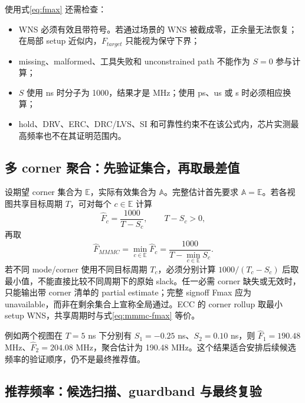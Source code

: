 \documentclass[UTF8,a4paper,11pt,fontset=fandol]{ctexart}
\numberwithin{equation}{section}
\begin{document}
使用式\eqref{eq:fmax} 还需检查：
\begin{itemize}
  \item WNS 必须有效且带符号。若通过场景的 WNS 被截成零，正余量无法恢复；在局部 setup 近似内，$F_{target}$ 只能视为保守下界；
  \item missing、malformed、工具失败和 unconstrained path 不能作为 $S=0$ 参与计算；
  \item $S$ 使用 ns 时分子为 1000，结果才是 MHz；使用 ps、us 或 s 时必须相应换算；
  \item hold、DRV、ERC、DRC/LVS、SI 和可靠性约束不在该公式内，芯片实测最高频率也不在其证明范围内。
\end{itemize}

\subsection{多 corner 聚合：先验证集合，再取最差值}

设期望 corner 集合为 $\mathbb{E}$，实际有效集合为 $\mathbb{A}$。完整估计首先要求 $\mathbb{A}=\mathbb{E}$。若各视图共享目标周期 $T$，可对每个 $c\in\mathbb{E}$ 计算
\begin{equation}
\widehat{F}_c=\frac{1000}{T-S_c},\qquad T-S_c>0,
\end{equation}
再取
\begin{equation}
\widehat{F}_{MMMC}=\min_{c\in\mathbb{E}}\widehat{F}_c
=\frac{1000}{T-\min_{c\in\mathbb{E}}S_c}.
\label{eq:mmmc-fmax}
\end{equation}
若不同 mode/corner 使用不同目标周期 $T_c$，必须分别计算 $1000/(T_c-S_c)$ 后取最小值，不能直接比较不同周期下的原始 slack。任一必需 corner 缺失或无效时，只能输出带 corner 清单的 partial estimate；完整 signoff Fmax 应为 unavailable，而非在剩余集合上宣称全局通过。ECC 的 corner rollup 取最小 setup WNS，共享周期时与式\eqref{eq:mmmc-fmax} 等价。

例如两个视图在 $T=5$ ns 下分别有 $S_1=-0.25$ ns、$S_2=0.10$ ns，则 $\widehat{F}_1=190.48$ MHz、$\widehat{F}_2=204.08$ MHz，聚合估计为 190.48 MHz。这个结果适合安排后续候选频率的验证顺序，仍不是最终推荐值。

\subsection{推荐频率：候选扫描、guardband 与最终复验}
\end{document}
